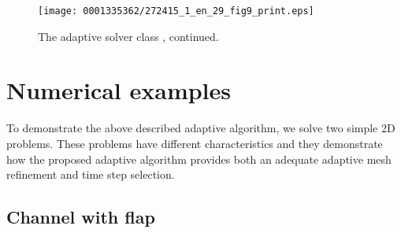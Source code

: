 \begin{figure}[!t]
\texttt{[image: 0001335362/272415\_1\_en\_29\_fig9\_print.eps]}
\caption{The adaptive solver class , continued.}
\label{selim:fig:FSISolver-2}
\end{figure}

\section{Numerical examples}

To demonstrate the above described adaptive algorithm, we solve two
simple 2D problems. These problems have different characteristics and
they demonstrate how the proposed adaptive algorithm provides both an
adequate adaptive mesh refinement and time step selection.

\subsection{Channel with flap}

